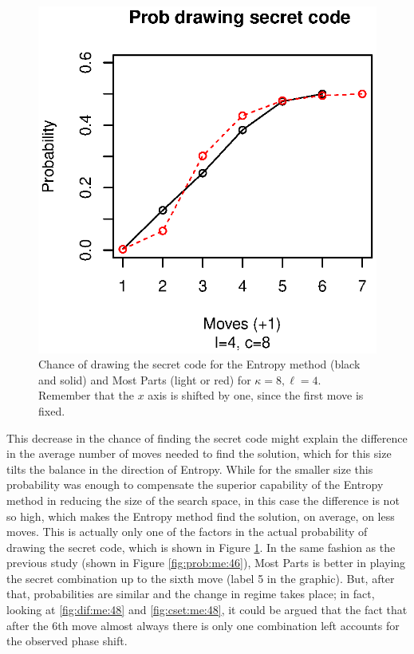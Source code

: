 \documentclass[preprint,12pt]{elsarticle}
\begin{document}
\begin{figure}[!htb]
\centering\smallskip
\includegraphics{prob-me-48.eps}
\caption{Chance of drawing the secret code for the
  Entropy method (black and solid) and Most Parts (light or
  red) for $\kappa=8, \ell=4$. Remember that the $x$ axis is shifted
  by one, since the first move is fixed.\label{fig:prob:me:48}}
\end{figure} 

This decrease in the chance of finding the secret code might
explain the difference in the average number of moves needed to find
the solution, which for this size tilts the balance in the direction
of Entropy. While for the smaller size this probability was enough to
compensate the superior capability of the Entropy method in reducing
the size of the search space, in this case the difference is not so
high, which makes the Entropy method find the solution, on average, on
less moves. This is actually only one of the factors in the actual
probability of drawing the secret code, which is shown
in Figure \ref{fig:prob:me:48}. In the same fashion as the previous
study (shown in Figure \ref{fig:prob:me:46}), Most Parts is better
in playing the secret combination up to the sixth move (label 5 in the
graphic). But, after that, probabilities are similar and the change in
regime takes place; in fact, looking at \ref{fig:dif:me:48} and
\ref{fig:cset:me:48}, it could be argued that the fact that after the
6th move almost always there is only one combination left accounts for
the observed phase shift. 
\end{document}
